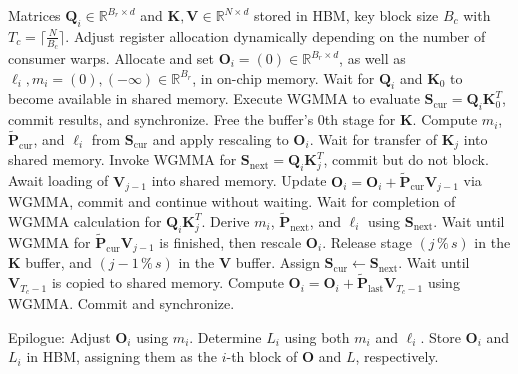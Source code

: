 \begin{algorithm}[H]
    \caption{\small\label{alg:flash3_wgmma}\textsc{FlashAttention-3} consumer warpgroup forward pass}
    \begin{algorithmic}[1]
      \REQUIRE  Matrices $\mathbf{Q}_i \in \mathbb{R}^{B_r \times d}$ and $\mathbf{K}, \mathbf{V} \in \mathbb{R}^{N \times d}$ stored in HBM, key block size $B_c$ with $T_c = \lceil \frac{N}{B_c} \rceil$.
      \STATE Adjust register allocation dynamically depending on the number of consumer warps.
      \STATE Allocate and set $\mathbf{O}_i = (0) \in \mathbb{R}^{B_r \times d}$, as well as $\ell_i, m_i = (0), (-\infty) \in \mathbb{R}^{B_r}$, in on-chip memory.
      \STATE Wait for $\mathbf{Q}_i$ and $\mathbf{K}_0$ to become available in shared memory.
      \STATE Execute WGMMA to evaluate $\mathbf{S}_{\mathrm{cur}} = \mathbf{Q}_i \mathbf{K}_0^T$, commit results, and synchronize.
      \STATE Free the buffer's $0$th stage for $\mathbf{K}$.
      \STATE Compute $m_{i}$, $\tilde{\mathbf{P}}_{\mathrm{cur}}$, and $\ell_{i}$ from $\mathbf{S}_{\mathrm{cur}}$ and apply rescaling to $\mathbf{O}_i$.
        \STATE Wait for transfer of $\mathbf{K}_j$ into shared memory.
        \label{code:mainloop_start}
        \STATE Invoke WGMMA for $\mathbf{S}_{\mathrm{next}} = \mathbf{Q}_i \mathbf{K}_{j}^T$, commit but do not block.
        \label{code:first_wgmma}
        \STATE Await loading of $\mathbf{V}_{j-1}$ into shared memory.
        \STATE Update $\mathbf{O}_{i} = \mathbf{O}_{i} + \tilde{\mathbf{P}}_{\mathrm{cur}} \mathbf{V}_{j-1}$ via WGMMA, commit and continue without waiting.
        \label{code:second_wgmma}
        \STATE Wait for completion of WGMMA calculation for $\mathbf{Q}_i \mathbf{K}_{j}^T$.
        \STATE Derive $m_{i}$, $\tilde{\mathbf{P}}_{\mathrm{next}}$, and $\ell_{i}$ using $\mathbf{S}_{\mathrm{next}}$. 
        \label{code:softmax}
        \STATE Wait until WGMMA for $\tilde{\mathbf{P}}_{\mathrm{cur}} \mathbf{V}_{j-1}$ is finished, then rescale $\mathbf{O}_i$.
        \STATE Release stage $(j\,\%\,s)$ in the $\mathbf{K}$ buffer, and $(j-1\,\%\,s)$ in the $\mathbf{V}$ buffer.
        \STATE Assign $\mathbf{S}_{\mathrm{cur}} \leftarrow \mathbf{S}_{\mathrm{next}}$.
        \label{code:mainloop_end}
      \ENDFOR
      \STATE Wait until $\mathbf{V}_{T_c - 1}$ is copied to shared memory.
      \STATE Compute 
      $\mathbf{O}_{i} = \mathbf{O}_{i} + \tilde{\mathbf{P}}_{\mathrm{last}} \mathbf{V}_{T_c - 1}$ using WGMMA. Commit and synchronize.

\STATE Epilogue: Adjust $\mathbf{O}_{i}$ using $m_{i}$. Determine $L_{i}$ using both $m_{i}$ and $\ell_{i}$.
Store $\mathbf{O}_{i}$ and $L_{i}$ in HBM, assigning them as the $i$-th block of $\mathbf{O}$ and $L$, respectively.
\end{algorithmic}
\end{algorithm}


